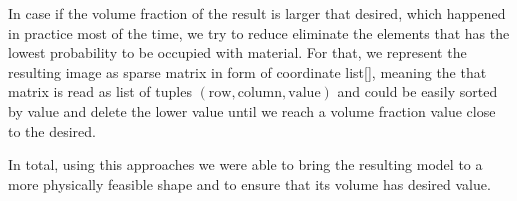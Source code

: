 In case if the volume fraction of the result is larger that desired, which happened in practice most of the time, we try to reduce eliminate the elements that has the lowest probability to be occupied with material.
For that, we represent the resulting image as sparse matrix in form of coordinate list\ref{}, meaning the that matrix is read as list of tuples $(\mathrm{row},\mathrm{column},\mathrm{value})$ and could be easily sorted by value and delete the lower value until we reach a volume fraction value close to the desired.
\medskip

In total, using this approaches we were able to bring the resulting model to a more physically feasible shape and to ensure that its volume has desired value.
\medskip
{}

 